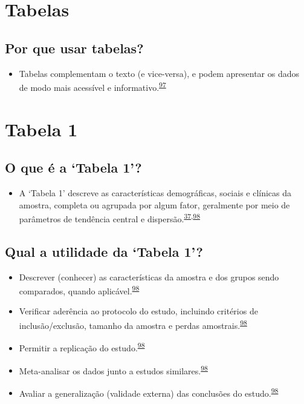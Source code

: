 \documentclass[
  a4paper,
]{book}
\providecommand{\tightlist}{%
  \setlength{\itemsep}{0pt}\setlength{\parskip}{0pt}}
\begin{document}
\hypertarget{tabelas}{%
\section{Tabelas}\label{tabelas}}

\hypertarget{por-que-usar-tabelas}{%
\subsection{Por que usar tabelas?}\label{por-que-usar-tabelas}}

\begin{itemize}
\tightlist
\item
  Tabelas complementam o texto (e vice-versa), e podem apresentar os dados de modo mais acessível e informativo.\textsuperscript{\protect\hyperlink{ref-Inskip2017}{97}}
\end{itemize}

\hypertarget{tabela-1}{%
\section{Tabela 1}\label{tabela-1}}

\hypertarget{o-que-uxe9-a-tabela-1}{%
\subsection{O que é a `Tabela 1'?}\label{o-que-uxe9-a-tabela-1}}

\begin{itemize}
\tightlist
\item
  A `Tabela 1' descreve as características demográficas, sociais e clínicas da amostra, completa ou agrupada por algum fator, geralmente por meio de parâmetros de tendência central e dispersão.\textsuperscript{\protect\hyperlink{ref-Westreich2013}{37},\protect\hyperlink{ref-chen2020}{98}}
\end{itemize}

\hypertarget{qual-a-utilidade-da-tabela-1}{%
\subsection{Qual a utilidade da `Tabela 1'?}\label{qual-a-utilidade-da-tabela-1}}

\begin{itemize}
\item
  Descrever (conhecer) as características da amostra e dos grupos sendo comparados, quando aplicável.\textsuperscript{\protect\hyperlink{ref-chen2020}{98}}
\item
  Verificar aderência ao protocolo do estudo, incluindo critérios de inclusão/exclusão, tamanho da amostra e perdas amostrais.\textsuperscript{\protect\hyperlink{ref-chen2020}{98}}
\item
  Permitir a replicação do estudo.\textsuperscript{\protect\hyperlink{ref-chen2020}{98}}
\item
  Meta-analisar os dados junto a estudos similares.\textsuperscript{\protect\hyperlink{ref-chen2020}{98}}
\item
  Avaliar a generalização (validade externa) das conclusões do estudo.\textsuperscript{\protect\hyperlink{ref-chen2020}{98}}
\end{itemize}
\end{document}
